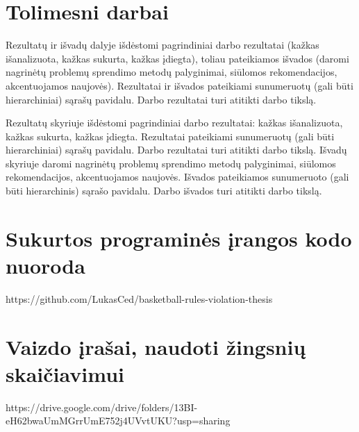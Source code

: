 \documentclass{VUMIFPSbakalaurinis}
\begin{document}
\section{Tolimesni darbai}


Rezultatų ir išvadų dalyje išdėstomi pagrindiniai darbo rezultatai (kažkas
išanalizuota, kažkas sukurta, kažkas įdiegta), toliau pateikiamos išvados
(daromi nagrinėtų problemų sprendimo metodų palyginimai, siūlomos
rekomendacijos, akcentuojamos naujovės). Rezultatai ir išvados pateikiami
sunumeruotų (gali būti hierarchiniai) sąrašų pavidalu. Darbo rezultatai turi
atitikti darbo tikslą.

Rezultatų skyriuje išdėstomi pagrindiniai darbo rezultatai: kažkas išanalizuota, kažkas sukurta, kažkas įdiegta. Rezultatai pateikiami sunumeruotų (gali būti hierarchiniai) sąrašų pavidalu. Darbo rezultatai turi atitikti darbo tikslą.
Išvadų skyriuje daromi nagrinėtų problemų sprendimo metodų palyginimai, siūlomos rekomendacijos, akcentuojamos naujovės. Išvados pateikiamos sunumeruoto (gali būti hierarchinis) sąrašo pavidalu. Darbo išvados turi atitikti darbo tikslą. 


\printbibliography[heading=bibintoc]  %


\appendix  %

\section{Sukurtos programinės įrangos kodo nuoroda}
https://github.com/LukasCed/basketball-rules-violation-thesis

\section{Vaizdo įrašai, naudoti žingsnių skaičiavimui}
https://drive.google.com/drive/folders/13BI-eH62bwaUmMGrrUmE752j4UVvtUKU?usp=sharing
\end{document}
